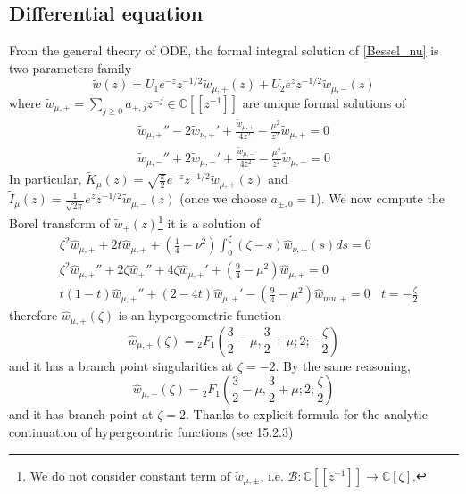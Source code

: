 \documentclass{article}
\newcommand{\C}{\mathbb{C}}
\begin{document}
\subsection{Differential equation}
From the general theory of ODE, the formal integral solution of \eqref{Bessel_nu} is two parameters family 
\begin{equation}
\tilde{w}(z)=U_1e^{-z}z^{-1/2}\tilde{w}_{\mu,+}(z)+U_2e^{z}z^{-1/2}\tilde{w}_{\mu,-}(z)
\end{equation} 
where $\tilde{w}_{\mu,\pm}=\sum_{j\geq 0}a_{\pm,j}z^{-j}\in\C[\![z^{-1}]\!]$ are unique formal solutions of
\begin{align*}
\tilde{w}_{\mu,+}''-2\tilde{w}_{\nu,+}'+\frac{\tilde{w}_{\mu,+}}{4z^2}-\frac{\mu^2}{z^2}\tilde{w}_{\mu,+}=0\\
\tilde{w}_{\mu,-}''+2\tilde{w}_{\mu,-}'+\frac{\tilde{w}_{\mu,-}}{4z^2}-\frac{\mu^2}{z^2}\tilde{w}_{\mu,-}=0
\end{align*} 
In particular, $\tilde{K}_{\mu}(z)=\sqrt{\frac{\pi}{2}}e^{-z}z^{-1/2}\tilde{w}_{\mu,+}(z)$ and $\tilde{I}_\mu(z)=\frac{1}{\sqrt{2\pi}}e^zz^{-1/2}\tilde{w}_{\mu,-}(z)$ (once we choose $a_{\pm,0}=1$). We now compute the Borel transform of $\tilde{w}_+(z)$\footnote{We do not consider constant term of $\tilde{w}_{\mu,\pm}$, i.e. $\mathcal{B}:\C[\![z^{-1}]\!]\to \C[\zeta]$.} it is a solution of 
\begin{align*}
&\zeta^2\hat{w}_{\mu,+}+2t\hat{w}_{\mu,+}+\left(\frac{1}{4}-\nu^2\right)\int_0^{\zeta}(\zeta-s)\hat{w}_{\nu,+}(s)ds=0 &\\
&\zeta^2\hat{w}_{\mu,+}''+2\zeta\hat{w}_+''+4\zeta\hat{w}_{\mu,+}'+\left(\frac{9}{4}-\mu^2\right)\hat{w}_{\mu,+}=0 & \\
&t(1-t)\hat{w}_{\mu,+}''+(2-4t)\hat{w}_{\mu,+}'-\left(\frac{9}{4}-\mu^2\right)\hat{w}_{mu,+}=0 & t=-\frac{\zeta}{2}
\end{align*} 
therefore $\hat{w}_{\mu,+}(\zeta)$ is an hypergeometric function
\begin{equation}
\hat{w}_{\mu,+}(\zeta)={}_2F_1\left(\frac{3}{2}-\mu,\frac{3}{2}+\mu;2;-\frac{\zeta}{2}\right)
\end{equation}
and it has a branch point singularities at $\zeta=-2$. By the same reasoning, 
\begin{equation}
\hat{w}_{\mu,-}(\zeta)={}_2F_1\left(\frac{3}{2}-\mu,\frac{3}{2}+\mu;2;\frac{\zeta}{2}\right)
\end{equation} 
and it has branch point at $\zeta=2$. Thanks to explicit formula for the analytic continuation of hypergeomtric functions (see \cite{dlmf} 15.2.3)
\end{document}
